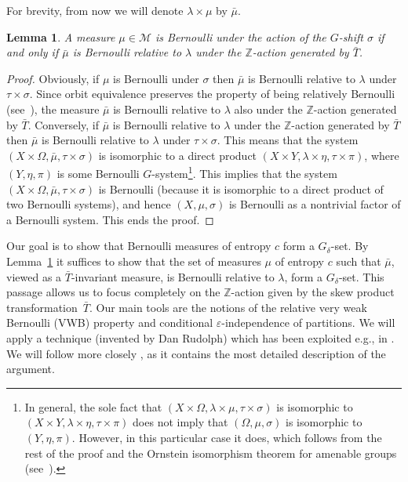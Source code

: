 \documentclass{amsart}
\newtheorem{lem}[thm]{Lemma}
\theoremstyle{remark}
\def \Z {\mathbb Z}
\def \M {\mathcal M}
\def \eps {\varepsilon}
\def \im {invariant measure}
\begin{document}
For brevity, from now we will denote $\lambda\times\mu$ by $\bar\mu$. 

\begin{lem}\label{L4}A measure
$\mu\in\M$ is Bernoulli under the action of the $G$-shift $\sigma$ if and only if $\bar\mu$ is Bernoulli relative to $\lambda$ under the $\Z$-action generated by $\bar T$. 
\end{lem}

\begin{proof}Obviously, if $\mu$ is Bernoulli under $\sigma$ then $\bar\mu$ is Bernoulli relative to $\lambda$ under $\tau\times\sigma$. Since orbit equivalence preserves the property of being relatively Bernoulli (see~\cite[Lemma~5.2]{1a}), the measure $\bar\mu$ is Bernoulli relative to $\lambda$ also under the $\Z$-action generated by $\bar T$.
Conversely, if $\bar\mu$ is Bernoulli relative to $\lambda$ under the $\Z$-action generated by $\bar T$ then $\bar\mu$ is Bernoulli relative to $\lambda$ under $\tau\times\sigma$. This means that the system $(X\times\Omega,\bar\mu,\tau\times\sigma)$ is isomorphic to a direct product $(X\times Y,\lambda\times\eta,\tau\times\pi)$, where $(Y,\eta,\pi)$ is some Bernoulli $G$-system\footnote{In general, the sole fact that $(X\times\Omega,\lambda\times\mu,\tau\times\sigma)$ is isomorphic to $(X\times Y,\lambda\times\eta,\tau\times\pi)$ does not imply that $(\Omega,\mu,\sigma)$ is isomorphic to $(Y,\eta,\pi)$. However, in this particular case it does, which follows from the rest of the proof and the Ornstein isomorphism theorem for amenable groups (see~\cite{8a}).}. This implies that the system
$(X\times\Omega,\bar\mu,\tau\times\sigma)$ is Bernoulli (because it is isomorphic to a direct product of two Bernoulli systems), and hence $(X,\mu,\sigma)$ is Bernoulli as a nontrivial factor of a Bernoulli system. This ends the proof. 
\end{proof}

Our goal is to show that Bernoulli measures of entropy $c$ form a $G_\delta$-set. By Lemma~\ref{L4} it suffices to show that the set of measures $\mu$ of entropy $c$ such that $\bar\mu$, viewed as a $\bar T$-\im, is Bernoulli relative to $\lambda$, form a $G_\delta$-set. This passage allows us to focus completely on the $\Z$-action given by the skew product transformation~$\bar T$. Our main tools are the notions of the relative very weak Bernoulli (VWB) property and conditional $\eps$-independence of partitions. We will apply a technique (invented by Dan Rudolph) which has been exploited e.g., in \cite{1a,5a,12a}. We will follow more closely \cite{12a}, as it contains the most detailed description of the argument.  
\end{document}
